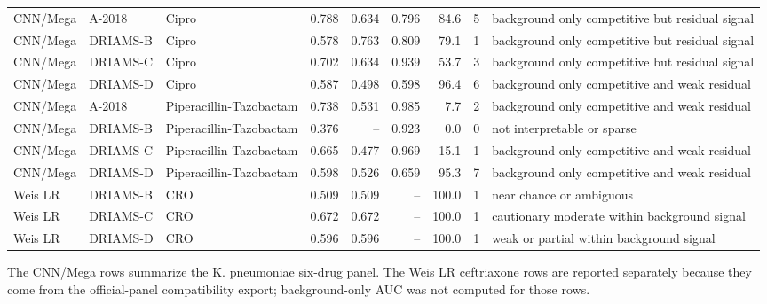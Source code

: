\begin{table}[ht]
{\begin{tabular}{lllrrrrll}
CNN/Mega & A-2018 & Cipro & 0.788 & 0.634 & 0.796 & 84.6 & 5 & background only competitive but residual signal \\
CNN/Mega & DRIAMS-B & Cipro & 0.578 & 0.763 & 0.809 & 79.1 & 1 & background only competitive but residual signal \\
CNN/Mega & DRIAMS-C & Cipro & 0.702 & 0.634 & 0.939 & 53.7 & 3 & background only competitive but residual signal \\
CNN/Mega & DRIAMS-D & Cipro & 0.587 & 0.498 & 0.598 & 96.4 & 6 & background only competitive and weak residual \\
CNN/Mega & A-2018 & Piperacillin-Tazobactam & 0.738 & 0.531 & 0.985 & 7.7 & 2 & background only competitive and weak residual \\
CNN/Mega & DRIAMS-B & Piperacillin-Tazobactam & 0.376 & -- & 0.923 & 0.0 & 0 & not interpretable or sparse \\
CNN/Mega & DRIAMS-C & Piperacillin-Tazobactam & 0.665 & 0.477 & 0.969 & 15.1 & 1 & background only competitive and weak residual \\
CNN/Mega & DRIAMS-D & Piperacillin-Tazobactam & 0.598 & 0.526 & 0.659 & 95.3 & 7 & background only competitive and weak residual \\
Weis LR & DRIAMS-B & CRO & 0.509 & 0.509 & -- & 100.0 & 1 & near chance or ambiguous \\
Weis LR & DRIAMS-C & CRO & 0.672 & 0.672 & -- & 100.0 & 1 & cautionary moderate within background signal \\
Weis LR & DRIAMS-D & CRO & 0.596 & 0.596 & -- & 100.0 & 1 & weak or partial within background signal \\
\bottomrule
\end{tabular}%
}
\vspace{2mm}\parbox{0.95\linewidth}{\footnotesize The CNN/Mega rows summarize the K. pneumoniae six-drug panel. The Weis LR ceftriaxone rows are reported separately because they come from the official-panel compatibility export; background-only AUC was not computed for those rows.}
\end{table}
